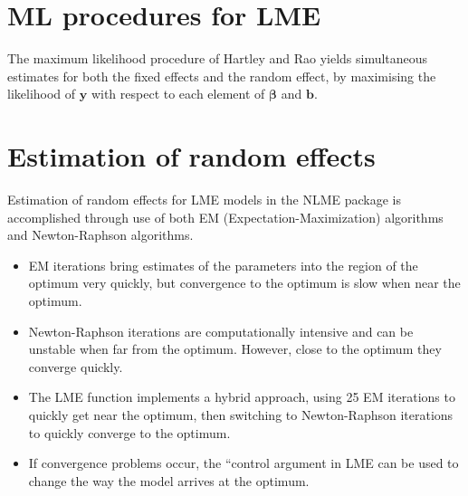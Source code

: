 \documentclass[12pt, a4paper]{article}
\theoremstyle{plain}
\theoremstyle{definition}
\theoremstyle{remark}
\begin{document}
\newpage
\section{ML procedures for LME}

The maximum likelihood procedure of Hartley and Rao yields
simultaneous estimates for both the fixed effects and the random
effect, by maximising the likelihood of $\boldsymbol{y}$ with
respect to each element of $\boldsymbol{\beta}$ and
$\boldsymbol{b}$.

\newpage
\section{Estimation of random effects}

Estimation of random effects for LME models in the NLME package is accomplished through use
of both EM (Expectation-Maximization) algorithms and Newton-Raphson algorithms.
\begin{itemize}
\item EM iterations bring estimates of the parameters into the region of the optimum very quickly, but
convergence to the optimum is slow when near the optimum.
\item Newton-Raphson iterations are computationally intensive and can be unstable when far from the
optimum. However, close to the optimum they converge quickly.
\item The LME function implements a hybrid approach, using 25 EM iterations to quickly get near the
optimum, then switching to Newton-Raphson iterations to quickly converge to the optimum. \item If
convergence problems occur, the ``control argument in LME can be used to change the way the
model arrives at the optimum.
\end{itemize}







\newpage
{}

\end{document}
